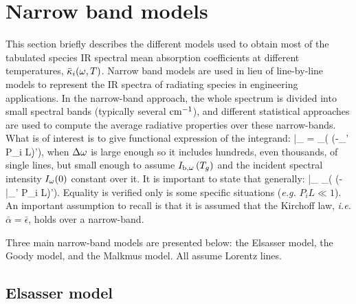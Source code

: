 \section{Narrow band models}\label{Sec::SNBM}
This section briefly describes the different models used to obtain most of the tabulated species IR spectral mean absorption coefficients at different temperatures, $\bar{\kappa}_i(\omega,T)$. Narrow band models are used in lieu of line-by-line models to represent the IR spectra of radiating species in engineering applications. In the narrow-band approach, the whole spectrum is divided into small spectral bands (typically several $\rm cm^{-1}$), and different statistical approaches are used to compute the average radiative properties over these narrow-bands. What is of interest is to give functional expression of the integrand:
\be
\bar{\tau}_{\om} = \displaystyle\int_{\Delta \om}\left( \exp\left(-\kappa_{\om'} P_i L\right)\d \om'\right),
\ee
when $\Delta \omega$ is large enough so it includes hundreds, even thousands, of single lines, but small enough to assume $I_{\rm b,\omega}\left(T_g\right)$ and the incident spectral intensity $I_{\omega}(0)$ constant over it. It is important to state that generally:
\be
\bar{\tau}_{\om} \neq \displaystyle\int_{\Delta \om}\left( \exp\left(-\bar{\kappa}_{\om'} P_i L\right)\d \om'\right).
\ee
Equality is verified only is some specific situations (\textit{e.g.} $P_iL \ll 1$). An important assumption to recall is that it is assumed that the Kirchoff law, \textit{i.e.} $\bar{\alpha} = \bar{\epsilon}$, holds over a narrow-band.

Three main narrow-band models are presented below: the Elsasser model, the Goody model, and the Malkmus model. All assume Lorentz lines.

\subsection{Elsasser model}

